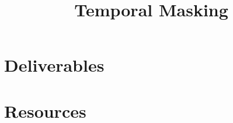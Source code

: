 

\title{Temporal Masking}

\maketitle
\tableofcontents

\section{Deliverables}

\section{Resources}




